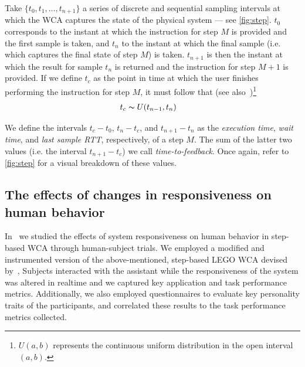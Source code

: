 Take \( \{ t_0, t_1, \ldots, t_{n + 1} \} \) a series of discrete and sequential sampling intervals at which the \ac{WCA} captures the state of the physical system --- see \cref{fig:step}.
\( t_0 \) corresponds to the instant at which the instruction for step \( M \) is provided and the first sample is taken, and \( t_n \) to the instant at which the final sample (i.e. which captures the final state of step \( M \)) is taken. 
\( t_{n + 1} \) is then the instant at which the result for sample \( t_n \) is returned and the instruction for step \( M + 1 \) is provided.
If we define \( t_c \) as the point in time at which the user finishes performing the instruction for step \( M \), it must follow that (see also~\cite{olguinmunoz:impact2021})\footnote{\( U(a, b) \) represents the continuous uniform distribution in the open interval \( (a, b) \).}
\begin{align}\label{eq:tc}
    t_c &\thicksim U(t_{n - 1}, t_n)
\end{align}

We define the intervals \( t_c - t_0 \), \( t_n - t_c \), and \( t_{n + 1} - t_n \) as the \emph{execution time}, \emph{wait time}, and \emph{last sample \ac{RTT}}, respectively, of a step \( M \).
The sum of the latter two values (i.e. the interval \( t_{n + 1} - t_c \)) we call \emph{time-to-feedback}.
Once again, refer to \cref{fig:step} for a visual breakdown of these values.

\subsection{The effects of changes in responsiveness on human behavior}

In~\cite{olguinmunoz:impact2021} we studied the effects of system responsiveness on human behavior in step-based \ac{WCA} through human-subject trials.
We employed a modified and instrumented version of the above-mentioned, step-based LEGO \ac{WCA} devised by~\textcite{Chen2015LEGO},
Subjects interacted with the assistant while the responsiveness of the system was altered in realtime and we captured key application and task performance metrics.
Additionally, we also employed questionnaires to evaluate key personality traits of the participants, and correlated these results to the task performance metrics collected.

